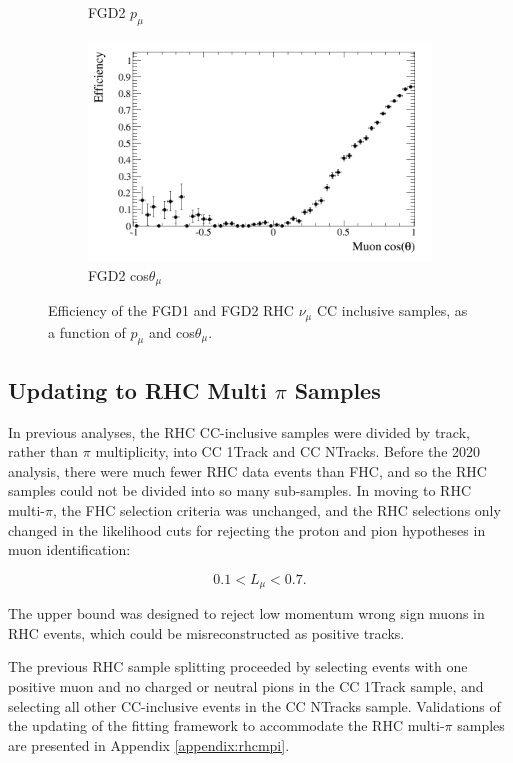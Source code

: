 \begin{figure}
\begin{subfigure}{.49\textwidth}
  \caption{FGD2 $p_{\mu}$}
\end{subfigure}
\begin{subfigure}{.49\textwidth}
  \centering
  \includegraphics[width=1.0\linewidth]{figs/effcosfgd2nuinnubar}
  \caption{FGD2 cos$\theta_{\mu}$}
\end{subfigure}
\caption{Efficiency of the FGD1 and FGD2 RHC $\nu_{\mu}$ CC inclusive samples, as a function of $p_{\mu}$ and cos$\theta_{\mu}$.}
\label{fig:nuinnubareff}
\end{figure}

\subsection{Updating to RHC Multi $\pi$ Samples}

In previous analyses, the RHC CC-inclusive samples were divided by track, rather than $\pi$ multiplicity, into CC 1Track and CC NTracks. Before the 2020 analysis, there were much fewer RHC data events than FHC, and so the RHC samples could not be divided into so many sub-samples. In moving to RHC multi-$\pi$, the FHC selection criteria was unchanged, and the RHC selections only changed in the likelihood cuts for rejecting the proton and pion hypotheses in muon identification:

\begin{equation}
0.1 < L_{\mu} < 0.7.
\end{equation}

The upper bound was designed to reject low momentum wrong sign muons in RHC events, which could be misreconstructed as positive tracks.

The previous RHC sample splitting proceeded by selecting events with one positive muon and no charged or neutral pions in the CC 1Track sample, and selecting all other CC-inclusive events in the CC NTracks sample. Validations of the updating of the fitting framework to accommodate the RHC multi-$\pi$ samples are presented in Appendix \ref{appendix:rhcmpi}.

